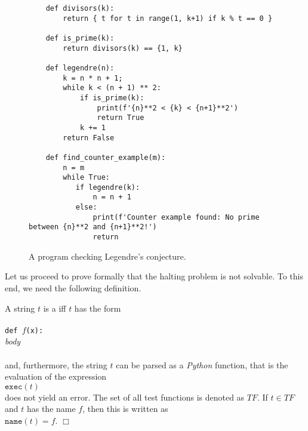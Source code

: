 \begin{figure}[!ht]
\centering
\begin{verbatim}
    def divisors(k):
        return { t for t in range(1, k+1) if k % t == 0 }

    def is_prime(k):
        return divisors(k) == {1, k}    
    
    def legendre(n):
        k = n * n + 1;
        while k < (n + 1) ** 2:
            if is_prime(k):
                print(f'{n}**2 < {k} < {n+1}**2')
                return True
            k += 1
        return False

    def find_counter_example(m):
        n = m
        while True:
           if legendre(k):
               n = n + 1
           else:
               print(f'Counter example found: No prime between {n}**2 and {n+1}**2!')
               return
\end{verbatim}
\vspace*{-0.3cm}
\caption{A program checking Legendre's conjecture.}
\label{fig:legendre.stlx}
\end{figure}

Let us proceed to prove formally that the halting problem is not solvable.  To this end, we need the
following definition.

\begin{Definition} 
A string $t$ is a  iff $t$ has the form \\[0.2cm]
\hspace*{1.3cm} \texttt{}         \\
\hspace*{1.3cm} \texttt{def $f$(x):} \\
\hspace*{1.8cm} \textsl{body}        \\
\hspace*{1.3cm} \texttt{}         \\[0.2cm]
and, furthermore, the string $t$ can be parsed as a \textsl{Python} function, that is the evaluation of
the expression
\\[0.2cm]
\hspace*{1.3cm}
$\texttt{exec}(t)$
\\[0.2cm]
does not yield an error.  
The set of all test functions is denoted as $T\!F$.  If $t \in T\!F$ and $t$ has the name $f$, then
this is written as 
\\[0.2cm]
\hspace*{1.3cm}
$\mathtt{name}(t) = f$. \hspace*{\fill} $\Box$
\end{Definition}

